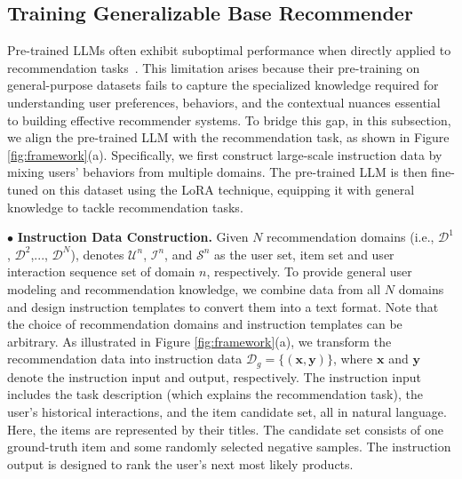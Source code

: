 \subsection{Training Generalizable Base Recommender}
\label{sec:stage1}
Pre-trained LLMs often exhibit suboptimal performance when directly applied to recommendation tasks~\cite{bao2023tallrec,10.1145/3678004}.
This limitation arises because their pre-training on general-purpose datasets fails to capture the specialized knowledge required for understanding user preferences, behaviors, and the contextual nuances essential to building effective recommender systems.
To bridge this gap, in this subsection, we align the pre-trained LLM with the recommendation task, as shown in Figure \ref{fig:framework}(a). Specifically, we first construct large-scale instruction data by mixing users' behaviors from multiple domains.
The pre-trained LLM is then fine-tuned on this dataset using the LoRA technique, equipping it with general knowledge to tackle recommendation tasks.

\noindent$\bullet$ \quad\textbf{Instruction Data Construction.}
Given $N$ recommendation domains (i.e., $\mathcal{D}^1$, $\mathcal{D}^2$,..., $\mathcal{D}^N$), denotes $\mathcal{U}^n$, $\mathcal{I}^n$, and $\mathcal{S}^n$ as the user set, item set and user interaction sequence set of domain $n$, respectively.
To provide general user modeling and recommendation knowledge, we combine data from all $N$ domains and design instruction templates to convert them into a text format. Note that the choice of recommendation domains and instruction templates can be arbitrary. 
As illustrated in Figure \ref{fig:framework}(a), we transform the recommendation data into instruction data $\mathcal{D}_{g}=\{(\textbf{x}, \textbf{y})\}$, where $\textbf{x}$ and $\textbf{y}$ denote the instruction input and output, respectively. The instruction input includes the task description (which explains the recommendation task), the user’s historical interactions, and the item candidate set, all in natural language. Here, the items are represented by their titles. The candidate set consists of one ground-truth item and some randomly selected negative samples. The instruction output is designed to rank the user's next most likely products.


